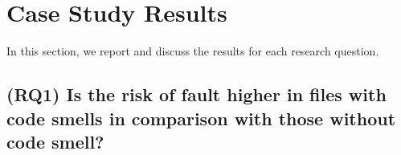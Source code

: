 \documentclass[smallcondensed]{svjour3}
\begin{document}
\section{Case Study Results}\label{sec:case-study}
In this section, we report and discuss the results for each research question.

\subsection*{(RQ1) Is the risk of fault higher in files with code smells in comparison with those without code smell?}


\end{document}

